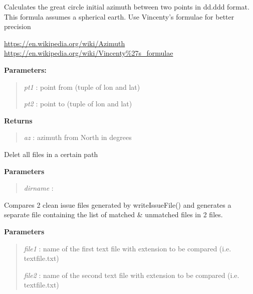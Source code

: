 \documentclass[letterpaper,10pt,english]{sphinxmanual}
\begin{document}
\begin{fulllineitems}
\label{code:Util.az}
Calculates the great circle initial azimuth between two points
in dd.ddd format. 
This formula assumes a spherical earth.  Use Vincenty's formulae
for better precision

\href{https://en.wikipedia.org/wiki/Azimuth}{https://en.wikipedia.org/wiki/Azimuth}
\href{https://en.wikipedia.org/wiki/Vincenty\%27s\_formulae}{https://en.wikipedia.org/wiki/Vincenty\%27s\_formulae}

\textbf{Parameters:}
\begin{quote}

\emph{pt1} : point from (tuple of lon and lat)

\emph{pt2} : point to (tuple of lon and lat)
\end{quote}

\textbf{Returns}
\begin{quote}

\emph{az}  : azimuth from North in degrees
\end{quote}

\end{fulllineitems}


\begin{fulllineitems}
\label{code:Util.cleartree}
Delet all files in a certain path

\textbf{Parameters}
\begin{quote}

\emph{dirname} :
\end{quote}

\end{fulllineitems}


\begin{fulllineitems}
\label{code:Util.compareIssueFiles}
Compares 2 clean issue files generated by writeIssueFile() and
generates a separate file containing the list of matched \& unmatched files in 2 files.

\textbf{Parameters}
\begin{quote}

\emph{file1} : name of the first text file with extension to be compared (i.e. textfile.txt)

\emph{file2} : name of the second text file with extension to be compared (i.e. textfile.txt)
\end{quote}

\end{fulllineitems}
\end{document}
